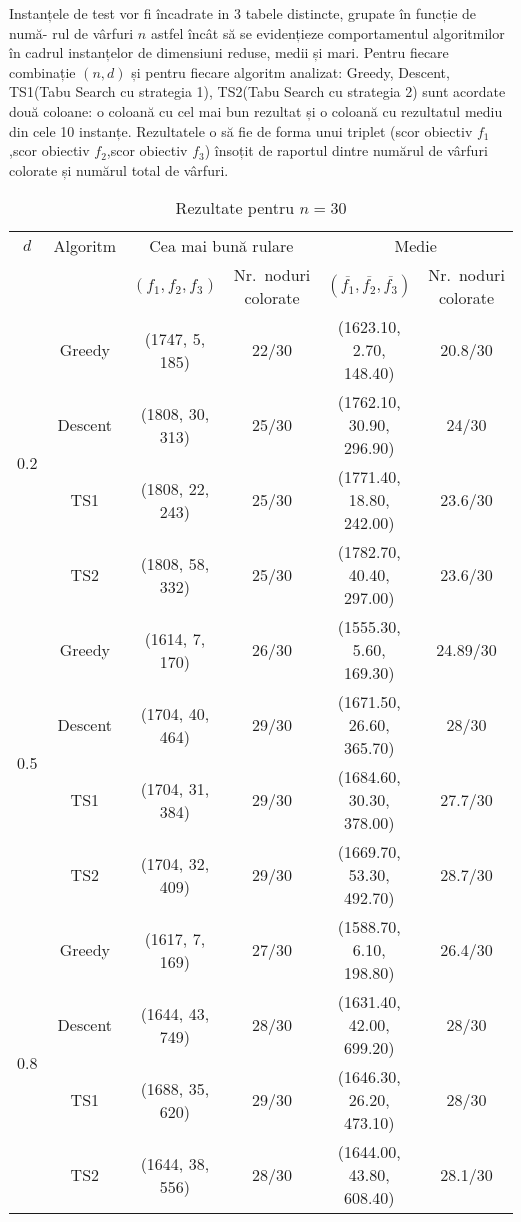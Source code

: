 Instanțele de test vor fi încadrate in 3 tabele distincte, grupate în funcție de  numă- rul de vârfuri $n$ astfel încât să se evidențieze comportamentul algoritmilor în cadrul instanțelor de dimensiuni reduse, medii și mari. Pentru fiecare combinație $(n,d)$ și pentru fiecare algoritm analizat: Greedy, Descent, TS1(Tabu Search cu strategia 1), TS2(Tabu Search cu strategia 2) sunt acordate două coloane: o coloană cu cel mai bun rezultat și o coloană cu rezultatul mediu din cele 10 instanțe. Rezultatele o să fie de forma unui triplet (scor obiectiv $f_1$,scor obiectiv $f_2$,scor obiectiv $f_3$) însoțit de raportul dintre numărul de vârfuri colorate și numărul total de vârfuri.

\begin{table}[H]
\centering
\caption{Rezultate pentru $n = 30$}
\scriptsize
\begin{tabular}{cc  cc  cc}
\toprule
$d$ & Algoritm 
    & \multicolumn{2}{c}{Cea mai bună rulare} 
    & \multicolumn{2}{c}{Medie} \\
\cmidrule(r){3-4} \cmidrule(l){5-6}
& 
& $(f_1, f_2, f_3)$ & Nr.\ noduri colorate 
& $(\overline{f_1}, \overline{f_2}, \overline{f_3})$ & Nr.\ noduri colorate \\
\midrule
\multirow{4}{*}{0.2}
  & Greedy  & (1747, 5, 185)   & 22/30  & (1623.10, 2.70, 148.40)   & 20.8/30 \\
  & Descent & (1808, 30, 313)  & 25/30  & (1762.10, 30.90, 296.90)  & 24/30 \\
  & TS1     & (1808, 22, 243)  & 25/30  & (1771.40, 18.80, 242.00)  & 23.6/30 \\
  & TS2     & (1808, 58, 332)  & 25/30  & (1782.70, 40.40, 297.00)  & 23.6/30 \\
\midrule
\multirow{4}{*}{0.5}
  & Greedy  & (1614, 7, 170)   & 26/30  & (1555.30, 5.60, 169.30)   & 24.89/30 \\
  & Descent & (1704, 40, 464)  & 29/30  & (1671.50, 26.60, 365.70)  & 28/30 \\
  & TS1     & (1704, 31, 384)  & 29/30  & (1684.60, 30.30, 378.00)  & 27.7/30 \\
  & TS2     & (1704, 32, 409)  & 29/30  & (1669.70, 53.30, 492.70)  & 28.7/30 \\
\midrule
\multirow{4}{*}{0.8}
  & Greedy  & (1617, 7, 169)   & 27/30  & (1588.70, 6.10, 198.80)   & 26.4/30 \\
  & Descent & (1644, 43, 749)  & 28/30  & (1631.40, 42.00, 699.20)  & 28/30 \\
  & TS1     & (1688, 35, 620)  & 29/30  & (1646.30, 26.20, 473.10)  & 28/30 \\
  & TS2     & (1644, 38, 556)  & 28/30  & (1644.00, 43.80, 608.40)  & 28.1/30 \\
\bottomrule
\end{tabular}\label{tab:rezultate_n30}
\end{table}

